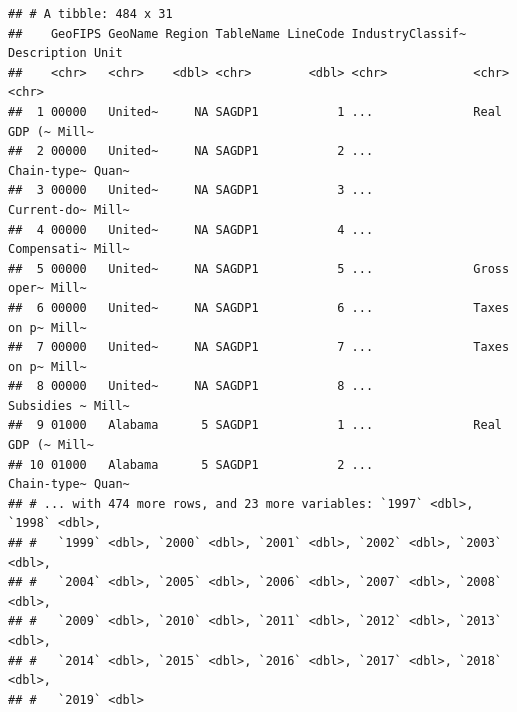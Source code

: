\documentclass[
]{article}
\begin{document}
\begin{verbatim}
## # A tibble: 484 x 31
##    GeoFIPS GeoName Region TableName LineCode IndustryClassif~ Description Unit 
##    <chr>   <chr>    <dbl> <chr>        <dbl> <chr>            <chr>       <chr>
##  1 00000   United~     NA SAGDP1           1 ...              Real GDP (~ Mill~
##  2 00000   United~     NA SAGDP1           2 ...              Chain-type~ Quan~
##  3 00000   United~     NA SAGDP1           3 ...              Current-do~ Mill~
##  4 00000   United~     NA SAGDP1           4 ...              Compensati~ Mill~
##  5 00000   United~     NA SAGDP1           5 ...              Gross oper~ Mill~
##  6 00000   United~     NA SAGDP1           6 ...              Taxes on p~ Mill~
##  7 00000   United~     NA SAGDP1           7 ...              Taxes on p~ Mill~
##  8 00000   United~     NA SAGDP1           8 ...              Subsidies ~ Mill~
##  9 01000   Alabama      5 SAGDP1           1 ...              Real GDP (~ Mill~
## 10 01000   Alabama      5 SAGDP1           2 ...              Chain-type~ Quan~
## # ... with 474 more rows, and 23 more variables: `1997` <dbl>, `1998` <dbl>,
## #   `1999` <dbl>, `2000` <dbl>, `2001` <dbl>, `2002` <dbl>, `2003` <dbl>,
## #   `2004` <dbl>, `2005` <dbl>, `2006` <dbl>, `2007` <dbl>, `2008` <dbl>,
## #   `2009` <dbl>, `2010` <dbl>, `2011` <dbl>, `2012` <dbl>, `2013` <dbl>,
## #   `2014` <dbl>, `2015` <dbl>, `2016` <dbl>, `2017` <dbl>, `2018` <dbl>,
## #   `2019` <dbl>
\end{verbatim}
\end{document}
